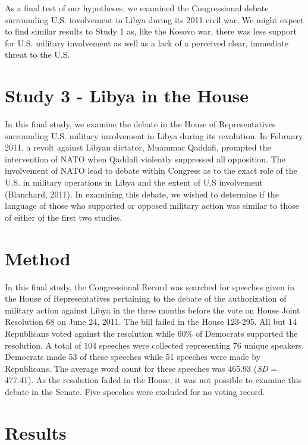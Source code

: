 \documentclass[english,,man]{apa6}
\begin{document}
As a final test of our hypotheses, we examined the Congressional debate surrounding U.S. involvement in Libya during its 2011 civil war. We might expect to find similar results to Study 1 as, like the Kosovo war, there was less support for U.S. military involvement as well as a lack of a perceived clear, immediate threat to the U.S.

\hypertarget{study-3---libya-in-the-house}{%
\section{Study 3 - Libya in the House}\label{study-3---libya-in-the-house}}

In this final study, we examine the debate in the House of Representatives surrounding U.S. military involvement in Libya during its revolution. In February 2011, a revolt against Libyan dictator, Muammar Qaddafi, prompted the intervention of NATO when Qaddafi violently suppressed all opposition. The involvement of NATO lead to debate within Congress as to the exact role of the U.S. in military operations in Libya and the extent of U.S involvement (Blanchard, 2011). In examining this debate, we wished to determine if the language of those who supported or opposed military action was similar to those of either of the first two studies.

\hypertarget{method-4}{%
\section{Method}\label{method-4}}

In this final study, the Congressional Record was searched for speeches given in the House of Representatives pertaining to the debate of the authorization of military action against Libya in the three months before the vote on House Joint Resolution 68 on June 24, 2011. The bill failed in the House 123-295. All but 14 Republicans voted against the resolution while 60\% of Democrats supported the resolution. A total of 104 speeches were collected representing 76 unique speakers. Democrats made 53 of these speeches while 51 speeches were made by Republicans. The average word count for these speeches was 465.93 (\emph{SD} = 477.41). As the resolution failed in the House, it was not possible to examine this debate in the Senate. Five speeches were excluded for no voting record.

\hypertarget{results-4}{%
\section{Results}\label{results-4}}
\end{document}
